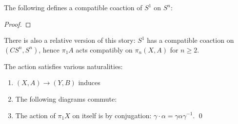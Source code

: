 \begin{subappendices}
\begin{lemma}
The following defines a compatible coaction of $S^1$ on $S^n$: 
\end{lemma}
\begin{proof}
\end{proof}

\begin{remark}
There is also a relative version of this story: $S^1$ has a compatible coaction on $(CS^n, S^n)$, hence $\pi_1 A$ acts compatibly on $\pi_n(X, A)$ for $n \ge 2$.
\end{remark}

\begin{lemma}
The action satisfies various naturalities:
\begin{enumerate}
    \item $(X, A) \to (Y, B)$ induces
    \begin{center}
    \end{center}
    \item The following diagrams commute:
    \begin{center}
    \end{center}
    \item The action of $\pi_1 X$ on itself is by conjugation: $\gamma \cdot \alpha = \gamma \alpha \gamma^{-1}$. \qed
\end{enumerate}
\end{lemma}


\end{subappendices}
